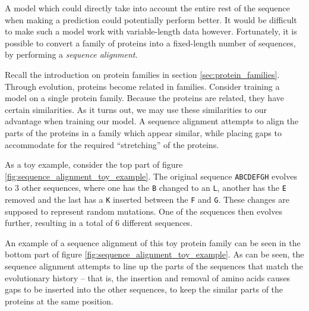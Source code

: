 A model which could directly take into account the entire rest of the sequence when making a prediction could potentially perform better. It would be difficult to make such a model work with variable-length data however. Fortunately, it is possible to convert a family of proteins into a fixed-length number of sequences, by performing a \textit{sequence alignment}.

Recall the introduction on protein families in section \ref{sec:protein_families}. Through evolution, proteins become related in families. Consider training a model on a single protein family. Because the proteins are related, they have certain similarities. As it turns out, we may use these similarities to our advantage when training our model. A sequence alignment attempts to align the parts of the proteins in a family which appear similar, while placing gaps to accommodate for the required ``stretching'' of the proteins.

As a toy example, consider the top part of figure \ref{fig:sequence_alignment_toy_example}. The original sequence \texttt{ABCDEFGH} evolves to 3 other sequences, where one has the \texttt{B} changed to an \texttt{L}, another has the \texttt{E} removed and the last has a \texttt{K} inserted between the \texttt{F} and \texttt{G}. These changes are supposed to represent random mutations. One of the sequences then evolves further, resulting in a total of 6 different sequences.

An example of a sequence alignment of this toy protein family can be seen in the bottom part of figure \ref{fig:sequence_alignment_toy_example}. As can be seen, the sequence alignment attempts to line up the parts of the sequences that match the evolutionary history -- that is, the insertion and removal of amino acids causes gaps to be inserted into the other sequences, to keep the similar parts of the proteins at the same position.

